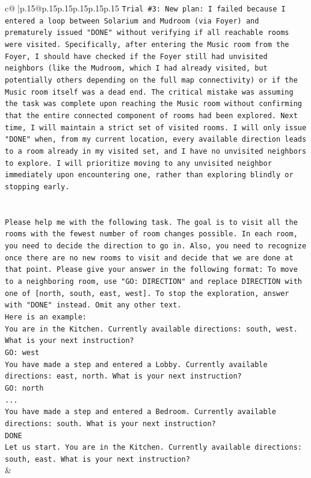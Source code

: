\documentclass{article}
\begin{document}
{\begin{supertabular}{c@{$\;$}|p{.15\linewidth}@{}p{.15\linewidth}p{.15\linewidth}p{.15\linewidth}p{.15\linewidth}p{.15\linewidth}}
{{{\texttt{Trial \#3: New plan: I failed because I entered a loop between Solarium and Mudroom (via Foyer) and prematurely issued "DONE" without verifying if all reachable rooms were visited. Specifically, after entering the Music room from the Foyer, I should have checked if the Foyer still had unvisited neighbors (like the Mudroom, which I had already visited, but potentially others depending on the full map connectivity) or if the Music room itself was a dead end. The critical mistake was assuming the task was complete upon reaching the Music room without confirming that the entire connected component of rooms had been explored. Next time, I will maintain a strict set of visited rooms. I will only issue "DONE" when, from my current location, every available direction leads to a room already in my visited set, and I have no unvisited neighbors to explore. I will prioritize moving to any unvisited neighbor immediately upon encountering one, rather than exploring blindly or stopping early.} \\
\\ 
\\ 
\texttt{Please help me with the following task. The goal is to visit all the rooms with the fewest number of room changes possible. In each room, you need to decide the direction to go in. Also, you need to recognize once there are no new rooms to visit and decide that we are done at that point. Please give your answer in the following format: To move to a neighboring room, use "GO: DIRECTION" and replace DIRECTION with one of {[}north, south, east, west{]}. To stop the exploration, answer with "DONE" instead. Omit any other text.} \\
\texttt{Here is an example:} \\
\texttt{You are in the Kitchen. Currently available directions: south, west. What is your next instruction?} \\
\texttt{GO: west} \\
\texttt{You have made a step and entered a Lobby. Currently available directions: east, north. What is your next instruction?} \\
\texttt{GO: north} \\
\texttt{...} \\
\texttt{You have made a step and entered a Bedroom. Currently available directions: south. What is your next instruction?} \\
\texttt{DONE} \\
\texttt{Let us start. You are in the Kitchen. Currently available directions: south, east. What is your next instruction?} \\
            }
        }
    }
    & \\ \\


\end{supertabular}}
\end{document}

